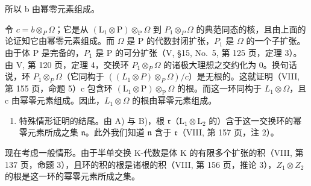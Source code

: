 所以 b 由幂零元素组成。

令 \(c = b \otimes_{P} \Omega\)；它是从 \((\mathrm{L}_{1} \otimes \mathrm{P}) \otimes_{\mathrm{P}} \Omega\) 到 \(P_{1} \otimes_{P} \Omega\) 的典范同态的核，且由上面的论证知它由幂零元素组成。而 \(\Omega\) 是 P 的代数封闭扩张，\(P_{1}\) 是 \(\Omega\) 的一个子扩张。由于体 P 是完备的，\(P_{1}\) 是 P 的可分扩张（V, §15, No.~5, 第 125 页，定理 3）。由 V, 第 120 页，定理 4，交换环 \(P_{1} \otimes_{P} \Omega\) 的诸极大理想之交约化为 0。换句话说，环 \(P_{1} \otimes_{P} \Omega\)（它同构于 \(((L_{1} \otimes P) \otimes_{P} \Omega)/c\)）是无根的。这就证明（VIII, 第 155 页，命题 5）c 包含环 \((\mathrm{L}_{1} \otimes \mathrm{P}) \otimes_{\mathrm{P}} \Omega\) 的根。而这一环同构于 \(L_{1} \otimes \Omega\)，且 c 由幂零元素组成。因此，\(L_{1} \otimes \Omega\) 的根由幂零元素组成。

\begin{enumerate}
\def\labelenumi{\Alph{enumi})}
\setcounter{enumi}{2}
\tightlist
\item
  特殊情形证明的结尾。由 A) 与 B)，根 \(\mathfrak{r}\)（\(\mathrm{L}_1\otimes \mathrm{L}_2\) 的）含于这一交换环的幂零元素所成之集 \(\mathfrak{n}\)。此外我们知道 \(\mathfrak{n}\) 含于 \(\mathfrak{r}\)（VIII, 第 157 页，注 2）。
\end{enumerate}

现在考虑一般情形。由于半单交换 K-代数是体 K 的有限多个扩张的积（VIII, 第 137 页，命题 3），且环的积的根是诸根的积（VIII, 第 156 页，推论 3），\(Z_{1} \otimes Z_{2}\) 的根是这一环的幂零元素所成之集。

